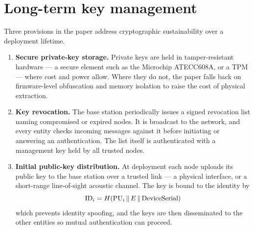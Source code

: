 \section{Long-term key management}

Three provisions in the paper address cryptographic sustainability over a deployment
lifetime.

\begin{enumerate}
\item \textbf{Secure private-key storage.} Private keys are held in tamper-resistant
      hardware --- a secure element such as the Microchip ATECC608A, or a TPM --- where cost
      and power allow. Where they do not, the paper falls back on firmware-level obfuscation
      and memory isolation to raise the cost of physical extraction.
\item \textbf{Key revocation.} The base station periodically issues a signed revocation
      list naming compromised or expired nodes. It is broadcast to the network, and every
      entity checks incoming messages against it before initiating or answering an
      authentication. The list itself is authenticated with a management key held by all
      trusted nodes.
\item \textbf{Initial public-key distribution.} At deployment each node uploads its public
      key to the base station over a trusted link --- a physical interface, or a short-range
      line-of-sight acoustic channel. The key is bound to the identity by
      \begin{equation}
      \mathrm{ID}_i = H(\mathrm{PU}_i \,\|\, E \,\|\, \mathrm{DeviceSerial})
      \end{equation}
      which prevents identity spoofing, and the keys are then disseminated to the other
      entities so mutual authentication can proceed.
\end{enumerate}
